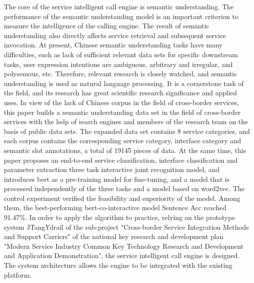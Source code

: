 \begin{englishabstract}
The core of the service intelligent call engine is semantic understanding. The performance of the semantic understanding model is an important criterion to measure the intelligence of the calling engine. The result of semantic understanding also directly affects service retrieval and subsequent service invocation. At present, Chinese semantic understanding tasks have many difficulties, such as lack of sufficient relevant data sets for specific downstream tasks, user expression intentions are ambiguous, arbitrary and irregular, and polysemous, etc. Therefore, relevant research is closely watched, and semantic understanding is used as natural language processing. It is a cornerstone task of the field, and its research has great scientific research significance and applied uses. In view of the lack of Chinese corpus in the field of cross-border services, this paper builds a semantic understanding data set in the field of cross-border services with the help of search engines and members of the research team on the basis of public data sets. The expanded data set contains 8 service categories, and each corpus contains the corresponding service category, interface category and semantic slot annotations, a total of 19145 pieces of data. At the same time, this paper proposes an end-to-end service classification, interface classification and parameter extraction three task interactive joint recognition model, and introduces bert as a pre-training model for fine-tuning, and a model that is processed independently of the three tasks and a model based on word2vec. The control experiment verified the feasibility and superiority of the model. Among them, the best-performing bert-co-interactive model Sentence Acc reached 91.47\%. In order to apply the algorithm to practice, relying on the prototype system JTangYdrail of the sub-project "Cross-border Service Integration Methods and Support Carriers" of the national key research and development plan "Modern Service Industry Common Key Technology Research and Development and Application Demonstration", the service intelligent call engine is designed. The system architecture allows the engine to be integrated with the existing platform.

\end{englishabstract}
